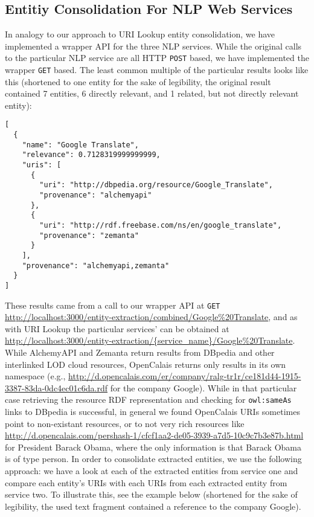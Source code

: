 \documentclass{acm_proc_article-sp}
\begin{document}
\subsection{Entitiy Consolidation For NLP Web Services}\label{sec:consolidation2}
In analogy to our approach to URI Lookup entity consolidation, we have implemented a wrapper API for the three NLP services. While the original calls to the particular NLP service are all HTTP \texttt{POST} based, we have implemented the wrapper \texttt{GET} based. The least common multiple of the particular results looks like this (shortened to one entity for the sake of legibility, the original result contained 7 entities, 6 directly relevant, and 1 related, but not directly relevant entity):
\begin{verbatim}
[ 
  {
    "name": "Google Translate",
    "relevance": 0.7128319999999999,
    "uris": [
      {
        "uri": "http://dbpedia.org/resource/Google_Translate",
        "provenance": "alchemyapi"
      },
      {
        "uri": "http://rdf.freebase.com/ns/en/google_translate",
        "provenance": "zemanta"
      }
    ],
    "provenance": "alchemyapi,zemanta"
  }
]
\end{verbatim}
These results came from a call to our wrapper API at \texttt{GET} \url{http://localhost:3000/entity-extraction/combined/Google%20Translate}, and as with URI Lookup the particular services' can be obtained at \url{http://localhost:3000/entity-extraction/{service_name}/Google%
\end{document}
